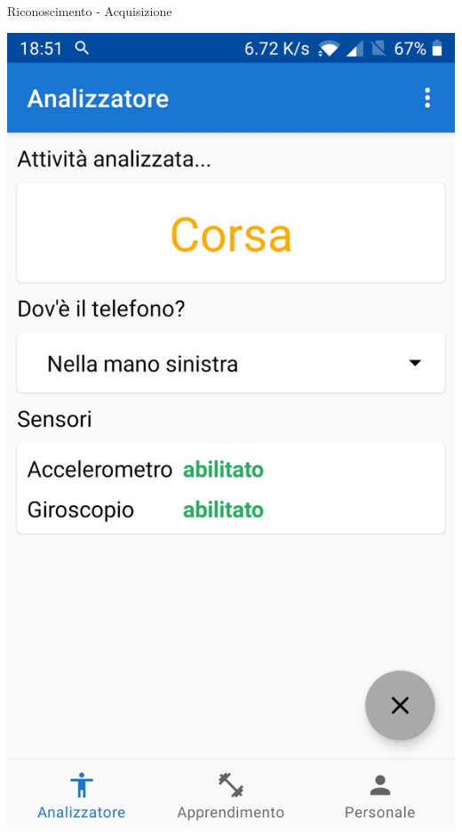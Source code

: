\begin{tframe}{Riconoscimento - Acquisizione}
\begin{minipage}{0.35\textwidth}
        \centering\includegraphics[scale = 0.09]{assets/images/screenshots/riconoscimento.jpg}        

    \end{minipage}%

\end{tframe}